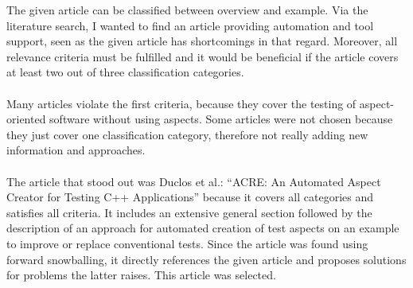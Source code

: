 The given article can be classified between overview and example. Via the literature search, I wanted to find an article providing automation and tool support, seen as the given article has shortcomings in that regard. Moreover, all relevance criteria must be fulfilled and it would be beneficial if the article covers at least two out of three classification categories.\\
\\
Many articles violate the first criteria, because they cover the testing of aspect-oriented software without using aspects. Some articles were not chosen because they just cover one classification category, therefore not really adding new information and approaches.\\
\\
The article that stood out was Duclos et al.: \enquote{ACRE: An Automated Aspect Creator for Testing C++ Applications} \cite{Duclos} because it covers all categories and satisfies all criteria. It includes an extensive general section followed by the description of an approach for automated creation of test aspects on an example to improve or replace conventional tests. Since the article was found using forward snowballing, it directly references the given article and proposes solutions for problems the latter raises. This article was selected.

